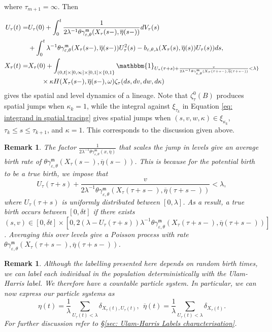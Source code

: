 \documentclass[12pt]{article}
\newtheorem{remark}[theorem]{Remark}
\begin{document}
where $\tau_{m+1}=\infty$. Then 

\begin{align*}
U_{\tau}(t)=&U_{\tau}(0)+\int_{0}^{t}\frac{1}{2\lambda^{-1} \theta \gamma^{\mathfrak{m}}_{\varepsilon,\theta}(X_{\tau}(s-), \overline{\eta}(s-))}dV_{\tau}(s)\\
&+\int_{0}^{t}\lambda^{-1} \theta \gamma^{\mathfrak{m}}_{\varepsilon,\theta}(X_{\tau}(s-), \overline{\eta}(s-))U^2_{\tau}(s)-b_{\varepsilon,\theta, \lambda}(X_{\tau}(s),\overline{\eta}(s))U_{\tau}(s))ds,\\  
X_{\tau}(t)=&X_{\tau}(0)+\int_{(0,t]\times[0,\infty]\times[0,1]\times\{0,1\}}\mathbbm{1}_{U_{\tau}(\tau+s)+ \frac{v}{2\lambda^{-1} \theta \gamma^{\mathfrak{m}}_{\varepsilon,\theta}(X_{\tau}(\tau+s-), \overline{\eta}(\tau+s-))}<\lambda\}}\\
&\qquad \times \kappa   H(X_{\tau}(s-), \overline{\eta}(s-),\omega)\zeta_{\tau}(ds,dv,dw,d\kappa)
\end{align*}
gives the spatial and level dynamics of a lineage. Note that $\zeta^{0}_{\tau}(B)$ produces spatial jumps when $\kappa_k=1$, while the integral against $\xi_{\tau_k}$ in Equation \eqref{eq: integrand in spatial tracing} gives spatial jumps when $(s,v,w,\kappa) \in \xi_{\kappa_k}$, $\tau_k \leq s \leq \tau_{k+1}$, and $\kappa = 1$. This corresponds to the discussion given above.
\begin{remark}
The factor $\frac{1}{2\lambda^{-1} \theta \gamma^{\mathfrak{m}}_{\varepsilon,\theta}(x, \overline{\eta})}$ that scales the jump in levels give an average birth rate of $\theta \gamma^{\mathfrak{m}}_{\varepsilon,\theta}(X_{\tau}(s-), \overline{\eta}(s-))$. This is because for the potential birth to be a true birth, we impose that $$U_{\tau}(\tau+s)+ \frac{v}{2\lambda^{-1} \theta \gamma^{\mathfrak{m}}_{\varepsilon,\theta}(X_{\tau}(\tau+s-), \overline{\eta}(\tau+s-))}< \lambda,$$ where $U_{\tau}(\tau+s)$ is uniformly distributed between $[0, \lambda]$. As a result, a true birth occurs between $[0,\delta t]$ if there exists $(s,v) \in [0,\delta t]\times [0, 2 (\lambda-U_{\tau}(\tau+s)) \lambda^{-1} \theta \gamma^{\mathfrak{m}}_{\varepsilon,\theta}(X_{\tau}(\tau+s-), \overline{\eta}(\tau+s-))]$. Averaging this over levels give a Poisson process with rate $ \theta \gamma^{\mathfrak{m}}_{\varepsilon,\theta}(X_{\tau}(\tau+s-), \overline{\eta}(\tau+s-))$. 
\end{remark}
\begin{remark}
Although the labelling presented here depends on random birth times, we can label each individual in the population deterministically with the Ulam-Harris label. We therefore have a countable particle system. In particular, we can now express our particle systems as
$$\eta(t)=\frac{1}{\lambda}\sum_{U_{\tau}(t) < \lambda} \delta_{X_{\tau}(t),U_{\tau}(t)}, ~~\overline{\eta}(t)=\frac{1}{\lambda}\sum_{ U_{\tau}(t) < \lambda} \delta_{X_{\tau}(t)}.$$
For further discussion refer to \S \ref{sec: Ulam-Harris Labels characterisation}.
\end{remark}
\end{document}

